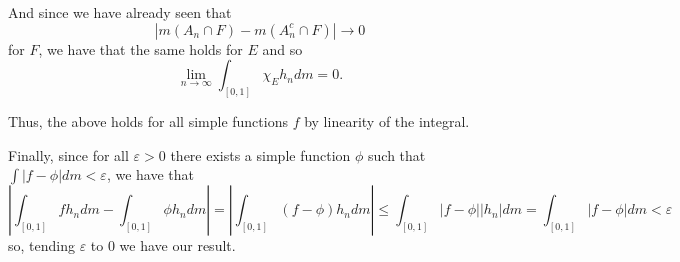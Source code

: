 \documentclass[12pt]{Qual}
\begin{document}
\begin{solution}
And since we have already seen that $$|m(A_n\cap F)-m(A_n^c\cap F)|\to0$$ for $F$, we have that the same holds for $E$ and so $$\lim_{n\to\infty}\int_{[0,1]}\chi_Eh_ndm=0.$$

Thus, the above holds for all simple functions $f$ by linearity of the integral.

Finally, since for all $\varepsilon>0$ there exists a simple function $\phi$ such that $\int|f-\phi|dm<\varepsilon$, we have that $$\left|\int_{[0,1]}fh_ndm-\int_{[0,1]}\phi h_ndm\right|=\left|\int_{[0,1]}(f-\phi)h_ndm\right|\le\int_{[0,1]}|f-\phi||h_n|dm=\int_{[0,1]}|f-\phi|dm<\varepsilon$$ so, tending $\varepsilon$ to $0$ we have our result.
\end{solution}
\vspace{0.5cm}
\end{document}
